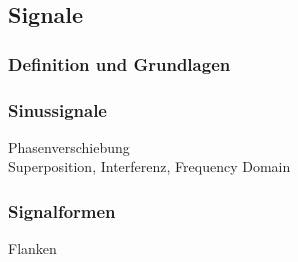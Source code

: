 \subsection{Signale}

\subsubsection{Definition und Grundlagen}

\subsubsection{Sinussignale}
Phasenverschiebung\\
Superposition, Interferenz, Frequency Domain

\subsubsection{Signalformen}
Flanken
